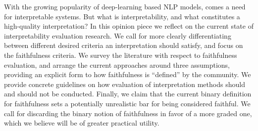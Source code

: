 With the growing popularity of deep-learning based NLP models, comes a need for interpretable systems. But what is interpretability, and what constitutes a high-quality interpretation? In this opinion piece we reflect on the current state of interpretability evaluation research. We call for more clearly differentiating between different desired criteria an interpretation should satisfy, and focus on the faithfulness criteria. We survey the literature with respect to faithfulness evaluation, and arrange the current approaches around three assumptions, providing an explicit form to how faithfulness is ``defined'' by the community. We provide concrete guidelines on how evaluation of interpretation methods should and should not be conducted. Finally, we claim that the current binary definition for faithfulness sets a potentially unrealistic bar for being considered faithful. We call for discarding the binary notion of faithfulness in favor of a more graded one, which we believe will be of greater practical utility.
